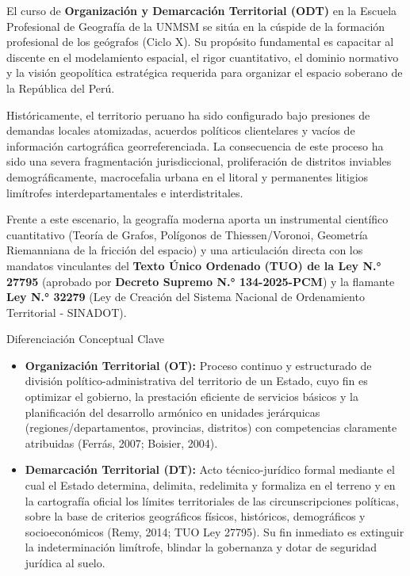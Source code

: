 \documentclass[11pt,a4paper]{article}
\begin{document}
El curso de \textbf{Organización y Demarcación Territorial (ODT)} en la Escuela Profesional de Geografía de la UNMSM se sitúa en la cúspide de la formación profesional de los geógrafos (Ciclo X). Su propósito fundamental es capacitar al discente en el modelamiento espacial, el rigor cuantitativo, el dominio normativo y la visión geopolítica estratégica requerida para organizar el espacio soberano de la República del Perú.

Históricamente, el territorio peruano ha sido configurado bajo presiones de demandas locales atomizadas, acuerdos políticos clientelares y vacíos de información cartográfica georreferenciada. La consecuencia de este proceso ha sido una severa fragmentación jurisdiccional, proliferación de distritos inviables demográficamente, macrocefalia urbana en el litoral y permanentes litigios limítrofes interdepartamentales e interdistritales.

Frente a este escenario, la geografía moderna aporta un instrumental científico cuantitativo (Teoría de Grafos, Polígonos de Thiessen/Voronoi, Geometría Riemanniana de la fricción del espacio) y una articulación directa con los mandatos vinculantes del \textbf{Texto Único Ordenado (TUO) de la Ley N.° 27795} (aprobado por \textbf{Decreto Supremo N.° 134-2025-PCM}) y la flamante \textbf{Ley N.° 32279} (Ley de Creación del Sistema Nacional de Ordenamiento Territorial - SINADOT).

\begin{conceptbox}{Diferenciación Conceptual Clave}
\begin{itemize}[leftmargin=*]
    \item \textbf{Organización Territorial (OT):} Proceso continuo y estructurado de división político-administrativa del territorio de un Estado, cuyo fin es optimizar el gobierno, la prestación eficiente de servicios básicos y la planificación del desarrollo armónico en unidades jerárquicas (regiones/departamentos, provincias, distritos) con competencias claramente atribuidas (Ferrás, 2007; Boisier, 2004).
    \item \textbf{Demarcación Territorial (DT):} Acto técnico-jurídico formal mediante el cual el Estado determina, delimita, redelimita y formaliza en el terreno y en la cartografía oficial los límites territoriales de las circunscripciones políticas, sobre la base de criterios geográficos físicos, históricos, demográficos y socioeconómicos (Remy, 2014; TUO Ley 27795). Su fin inmediato es extinguir la indeterminación limítrofe, blindar la gobernanza y dotar de seguridad jurídica al suelo.
\end{itemize}
\end{conceptbox}
\end{document}
